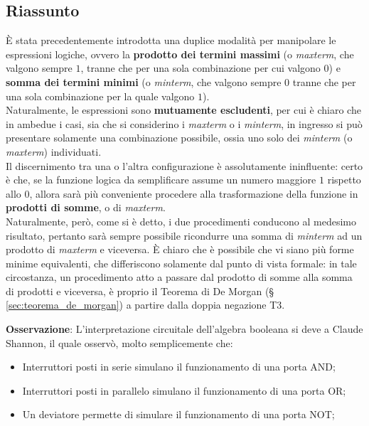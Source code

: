 \documentclass[a4paper]{extarticle}
\begin{document}
\subsection{Riassunto}
È stata precedentemente introdotta una duplice modalità per manipolare le espressioni logiche, ovvero la \textbf{prodotto dei termini massimi} (o \textit{maxterm}, che valgono sempre \(1\), tranne che per una sola combinazione per cui valgono \(0\)) e \textbf{somma dei termini minimi} (o \textit{minterm}, che valgono sempre \(0\) tranne che per una sola combinazione per la quale valgono \(1\)).\\
Naturalmente, le espressioni sono \textbf{mutuamente escludenti}, per cui è chiaro che in ambedue i casi, sia che si considerino i \emph{maxterm} o i \emph{minterm}, in ingresso si può presentare solamente una combinazione possibile, ossia uno solo dei \textit{minterm} (o \textit{maxterm}) individuati.\\
Il discernimento tra una o l'altra configurazione è assolutamente ininfluente: certo è che, se la funzione logica da semplificare assume un numero maggiore \(1\) rispetto allo \(0\), allora sarà più conveniente procedere alla trasformazione della funzione in \textbf{prodotti di somme}, o di \textit{maxterm}.\\
Naturalmente, però, come si è detto, i due procedimenti conducono al medesimo risultato, pertanto sarà sempre possibile ricondurre una somma di \textit{minterm} ad un prodotto di \textit{maxterm} e viceversa. È chiaro che è possibile che vi siano più forme minime equivalenti, che differiscono solamente dal punto di vista formale: in tale circostanza, un procedimento atto a passare dal prodotto di somme alla somma di prodotti e viceversa, è proprio il Teorema di De Morgan (§ \ref{sec:teorema_de_morgan}) a partire dalla doppia negazione T3.

\vspace{1em}
\noindent
\textbf{Osservazione}: L'interpretazione circuitale dell'algebra booleana si deve a Claude Shannon, il quale osservò, molto semplicemente che:

\begin{itemize}
    \item Interruttori posti in serie simulano il funzionamento di una porta AND;
    \item Interruttori posti in parallelo simulano il funzionamento di una porta OR;
    \item Un deviatore permette di simulare il funzionamento di una porta NOT;
\end{itemize}
\end{document}

